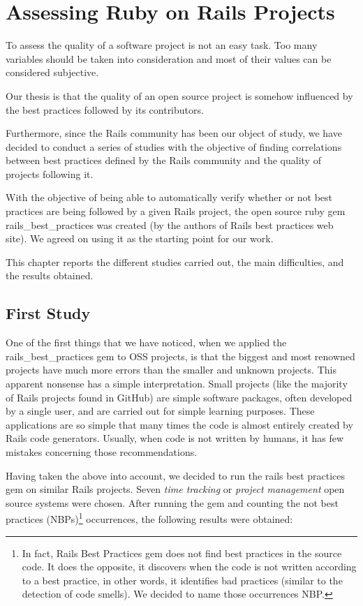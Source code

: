 \thispagestyle{empty}
\chapter{Assessing Ruby on Rails Projects}\label{chap:assissing_ror}

To assess the quality of a software project is not an easy task.
Too many variables should be taken into consideration and most of their values can be considered subjective.

Our thesis is that the quality of an open source project is somehow influenced by the best practices followed 
by its contributors.

Furthermore, since the Rails community has been our object of study, we have decided to conduct a series of studies 
with the objective of finding correlations between best practices defined by the Rails community and
the quality of projects following it.

With the objective of being able to automatically verify whether or not best practices are being followed by
a given Rails project, the open source ruby gem rails\_best\_practices 
was created (by the authors of Rails best practices web site).
We agreed on using it as the starting point for our work.

This chapter reports the different studies carried out, the main difficulties, and the results obtained.



\section{First Study}\label{subsec:first_study}
One of the first things that we have noticed, when we applied the rails\_best\_practices gem to OSS projects,
is that the biggest and most renowned projects have much more errors than the smaller and unknown projects.
This apparent nonsense has a simple  interpretation.
Small projects (like the majority of Rails projects found in GitHub) are simple software packages,
often developed by a single user, and are carried out for simple learning purposes.
These applications are so simple that many times the code is almost entirely created by Rails code generators.
Usually, when code is not written by humans, it has few mistakes concerning those recommendations.

Having taken the above into account, we decided to run the rails best practices gem on similar Rails projects.
Seven \emph{time tracking} or \emph{project management} open source systems were chosen.
After running the gem and counting the
\textsf{not best practices (NBPs)}\footnote{In fact, Rails Best Practices gem does not find best practices in the source code.
  It does the opposite, it discovers when the code is not written according to a best practice, in other words, 
  it identifies bad practices (similar to the detection of code smells).
  We decided to name those occurrences NBP.
}
occurrences, the following results were obtained:

